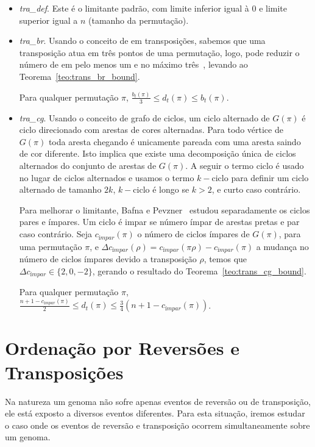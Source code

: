 \begin{itemize}
\item{\textit{tra\_def}. 
Este é o limitante padrão, com limite inferior igual à $0$ e limite
superior igual a $n$ (tamanho da permutação).}
\item{\textit{tra\_br}.
Usando o conceito de \bkp{} em transposições, sabemos que uma
transposição atua em três pontos de uma permutação, logo, pode reduzir
o número de \bkp{} em pelo menos um e no máximo
três~\cite{BafnaPevzner*1998}, levando ao
Teorema~\ref{teo:trans_br_bound}.

\begin{teo}
  \label{teo:trans_br_bound}
  Para qualquer permutação $\pi$, $\frac{b_t(\pi)}{3} \leq d_t(\pi) \leq
  b_t(\pi)$.
\end{teo}
}
\item{\textit{tra\_cg}.
Usando o conceito de grafo de ciclos, um ciclo alternado de $G(\pi)$ é
ciclo direcionado com arestas de cores alternadas. Para todo vértice
de $G(\pi)$ toda aresta chegando é unicamente pareada com uma aresta
saindo de cor diferente. Isto implica que existe uma decomposição
única de ciclos alternados do conjunto de arestas de $G(\pi)$. A
seguir o termo ciclo é usado no lugar de ciclos alternados e usamos o
termo $k-\text{ciclo}$ para definir um ciclo alternado de tamanho $2k$,
$k-\text{ciclo}$ é longo se $k > 2$, e curto caso contrário.

Para melhorar o limitante, Bafna e Pevzner~\cite{BafnaPevzner*1998}
estudou separadamente os ciclos pares e ímpares. Um ciclo é impar se
número ímpar de arestas pretas e par caso contrário. Seja
$c_{ímpar}(\pi)$ o número de ciclos ímpares de $G(\pi)$, para uma
permutação $\pi$, e $\Delta c_{ímpar} (\rho) = c_{ímpar} (\pi \rho) -
c_{ímpar} (\pi)$ a mudança no número de ciclos ímpares devido a
transposição $\rho$, temos que $\Delta c_{ímpar} \in \{2, 0, -2\}$,
gerando o resultado do Teorema~\ref{teo:trans_cg_bound}.

\begin{teo} 
  \label{teo:trans_cg_bound} 
  Para qualquer permutação $\pi$, $\frac{n + 1 - c_{ímpar}(\pi)}{2} \leq
  d_t(\pi) \leq \frac{3}{4} (n + 1 - c_{ímpar}(\pi))$.
\end{teo}
}
\end{itemize}


\section{Ordenação por Reversões e Transposições}
\label{sec:rev_trans}
Na natureza um genoma não sofre apenas eventos de reversão ou de
transposição, ele está exposto a diversos eventos diferentes. Para
esta situação, iremos estudar o caso onde os eventos de reversão e
transposição ocorrem simultaneamente sobre um genoma.

